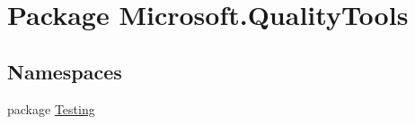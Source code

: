 \hypertarget{namespace_microsoft_1_1_quality_tools}{\section{Package Microsoft.\-Quality\-Tools}
\label{namespace_microsoft_1_1_quality_tools}
}
\subsection*{Namespaces}
\begin{DoxyCompactItemize}
\item 
package \hyperlink{namespace_microsoft_1_1_quality_tools_1_1_testing}{Testing}
\end{DoxyCompactItemize}
